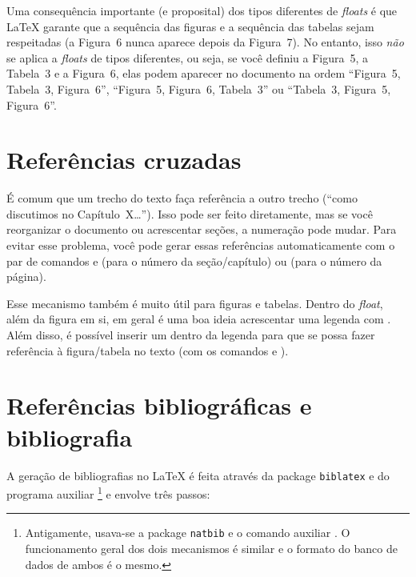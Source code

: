 Uma consequência importante (e proposital) dos tipos diferentes de
\emph{floats} é que \LaTeX{} garante que a sequência
das figuras e a sequência das tabelas sejam respeitadas (a Figura~6 nunca
aparece depois da Figura~7). No entanto, isso \emph{não} se aplica a
\emph{floats} de tipos diferentes, ou seja, se você definiu a Figura~5,
a Tabela~3 e a Figura~6, elas podem aparecer no documento na ordem
``Figura~5, Tabela~3, Figura~6'', ``Figura~5, Figura~6, Tabela~3'' ou
``Tabela~3, Figura~5, Figura~6''.

\section{Referências cruzadas}
\label{sec:refs}

É comum que um trecho do texto faça referência a outro trecho (``como
discutimos no Capítulo~X\ldots''). Isso pode ser feito diretamente, mas
se você reorganizar o documento ou acrescentar seções, a numeração pode
mudar. Para evitar esse problema, você pode gerar essas referências
automaticamente com o par de comandos  e
 (para o número da seção/capítulo) ou
 (para o número da página).

Esse mecanismo também é muito útil para figuras e tabelas. Dentro do
\emph{float}, além da figura em si, em geral é uma boa ideia acrescentar
uma legenda com . Além disso, é possível
inserir um  dentro da legenda para que se possa fazer
referência à figura/tabela no texto (com os comandos  e
).

\section{Referências bibliográficas e bibliografia}

A geração de bibliografias no \LaTeX{} é feita através da package
\texttt{biblatex} e do programa auxiliar
\footnote{Antigamente, usava-se a package
\texttt{natbib} e o comando auxiliar .
O funcionamento geral dos dois mecanismos é similar e o formato do banco
de dados de ambos é o mesmo.} e envolve três passos:


